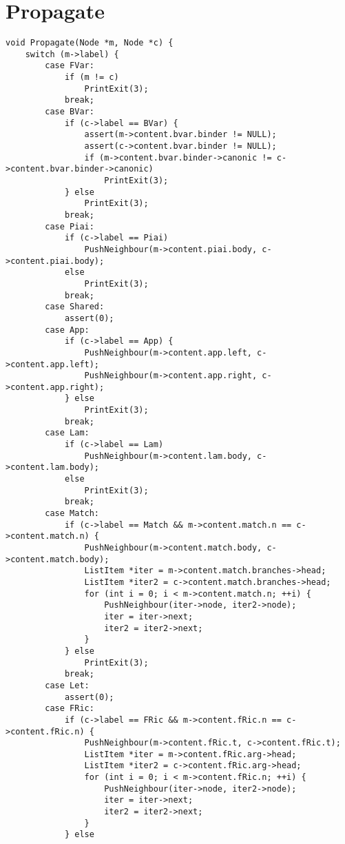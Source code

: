 \documentclass[12pt,a4paper,openright,twoside]{report}
\begin{document}
\section{Propagate}
\begin{verbatim}
void Propagate(Node *m, Node *c) {
    switch (m->label) {
        case FVar:
            if (m != c)
                PrintExit(3);
            break;
        case BVar:
            if (c->label == BVar) {
                assert(m->content.bvar.binder != NULL);
                assert(c->content.bvar.binder != NULL);
                if (m->content.bvar.binder->canonic != c->content.bvar.binder->canonic)
                    PrintExit(3);
            } else
                PrintExit(3);
            break;
        case Piai:
            if (c->label == Piai)
                PushNeighbour(m->content.piai.body, c->content.piai.body);
            else
                PrintExit(3);
            break;
        case Shared:
            assert(0);
        case App:
            if (c->label == App) {
                PushNeighbour(m->content.app.left, c->content.app.left);
                PushNeighbour(m->content.app.right, c->content.app.right);
            } else
                PrintExit(3);
            break;
        case Lam:
            if (c->label == Lam)
                PushNeighbour(m->content.lam.body, c->content.lam.body);
            else
                PrintExit(3);
            break;
        case Match:
            if (c->label == Match && m->content.match.n == c->content.match.n) {
                PushNeighbour(m->content.match.body, c->content.match.body);
                ListItem *iter = m->content.match.branches->head;
                ListItem *iter2 = c->content.match.branches->head;
                for (int i = 0; i < m->content.match.n; ++i) {
                    PushNeighbour(iter->node, iter2->node);
                    iter = iter->next;
                    iter2 = iter2->next;
                }
            } else
                PrintExit(3);
            break;
        case Let:
            assert(0);
        case FRic:
            if (c->label == FRic && m->content.fRic.n == c->content.fRic.n) {
                PushNeighbour(m->content.fRic.t, c->content.fRic.t);
                ListItem *iter = m->content.fRic.arg->head;
                ListItem *iter2 = c->content.fRic.arg->head;
                for (int i = 0; i < m->content.fRic.n; ++i) {
                    PushNeighbour(iter->node, iter2->node);
                    iter = iter->next;
                    iter2 = iter2->next;
                }
            } else

\end{verbatim}
\end{document}
